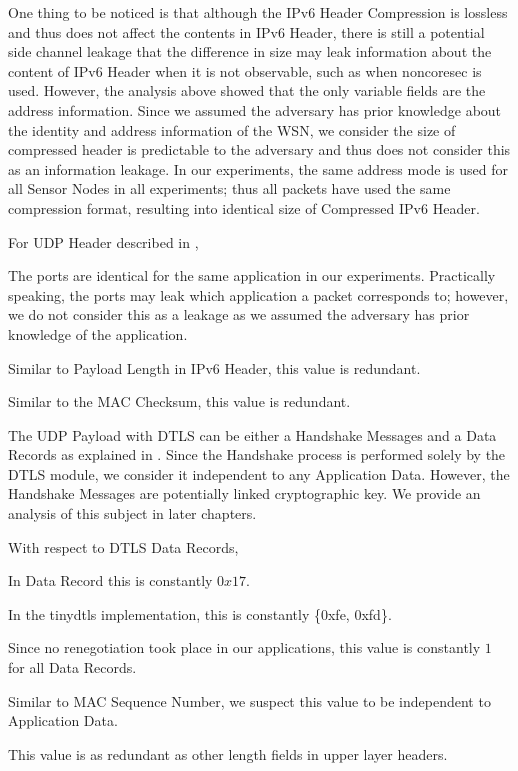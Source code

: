 One thing to be noticed is that although the IPv6 Header Compression is lossless and thus does not affect the contents in IPv6 Header, there is still a potential side channel leakage that the difference in size may leak information about the content of IPv6 Header when it is not observable, such as when noncoresec is used. However, the analysis above showed that the only variable fields are the address information. Since we assumed the adversary has prior knowledge about the identity and address information of the WSN, we consider the size of compressed header is predictable to the adversary and thus does not consider this as an information leakage. In our experiments, the same address mode is used for all Sensor Nodes in all experiments; thus all packets have used the same compression format, resulting into identical size of Compressed IPv6 Header.

For UDP Header described in ,

\begin{description}[style=nextline]
	\item[Source and Destination Port]
	The ports are identical for the same application in our experiments. Practically speaking, the ports may leak which application a packet corresponds to; however, we do not consider this as a leakage as we assumed the adversary has prior knowledge of the application.
	\item[Payload Length]
	Similar to Payload Length in IPv6 Header, this value is redundant.
	\item[Checksum]
	Similar to the MAC Checksum, this value is redundant.
\end{description}

The UDP Payload with DTLS can be either a Handshake Messages and a Data Records as explained in  . Since the Handshake process is performed solely by the DTLS module, we consider it independent to any Application Data. However,  the Handshake Messages are potentially linked cryptographic key. We provide an analysis of this subject in later chapters.

With respect to DTLS Data Records,

\begin{description}[style=nextline]
	\item[Content Type]
	In Data Record this is constantly $0x17$.
	\item[Protocol Version]
	In the tinydtls implementation, this is constantly \{0xfe, 0xfd\}.
	\item[Epoch]
	Since no renegotiation took place in our applications, this value is constantly $1$ for all Data Records.
	\item[Sequence Number]
	Similar to MAC Sequence Number, we suspect this value to be independent to Application Data.
	\item[Length]
	This value is as redundant as other length fields in upper layer headers.
\end{description}

